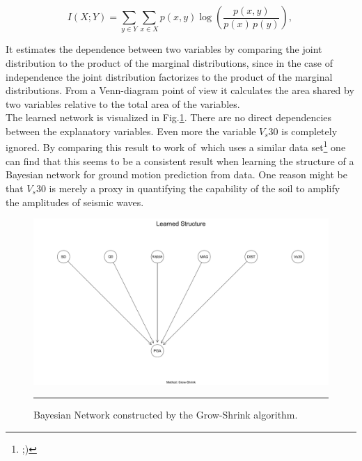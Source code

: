 \begin{equation}
I(X;Y) = \sum_{y \in Y} \sum_{x \in X} 
                 p(x,y) \log{ \left(\frac{p(x,y)}{p(x)\,p(y)}
                              \right) }, \,\! 
\label{eqn:mutual}
\end{equation}

It estimates the dependence between two variables by comparing the joint distribution to the product of the marginal distributions, since in the case of independence the joint distribution factorizes to the product of the marginal distributions. From a Venn-diagram point of view it calculates the area shared by two variables relative to the total area of the variables.\\
The learned network is visualized in Fig.\ref{fig:gs}. There are no direct dependencies between the explanatory variables. Even more the variable $V_s30$ is completely ignored. By comparing this result to work of~\citep{Vogel2014}which uses a similar data set\footnote{ ;)} one can find that this seems to be a consistent result when learning the structure of a Bayesian network for ground motion prediction from data. One reason might be that $V_s30$ is merely a proxy in quantifying the capability of the soil to amplify the amplitudes of seismic waves.\\

\begin{figure}[htbp]
	\centering
		\includegraphics[scale=0.33]{Figures/gs_one.pdf}
		\rule{35em}{0.5pt}
	\caption[Contraint-based Grow-Shrink Network]{Bayesian Network constructed by the Grow-Shrink algorithm.}
	\label{fig:gs}
\end{figure}

